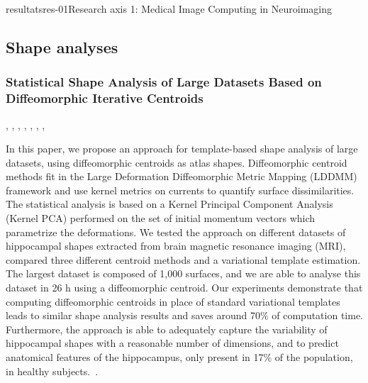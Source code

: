 \documentclass{ra2018}
\begin{document}
\begin{module}{resultats}{res-01}{Research axis 1: Medical Image Computing in Neuroimaging}
\subsection{Shape analyses}
\subsubsection{Statistical Shape Analysis of Large Datasets Based on Diffeomorphic Iterative Centroids}
\begin{participants}
      , 
      ,
      ,
      ,
      ,
      ,
      ,
\end{participants}
In this paper, we propose an approach for template-based shape analysis of large datasets, using diffeomorphic centroids as atlas shapes. Diffeomorphic centroid methods fit in the Large Deformation Diffeomorphic Metric Mapping (LDDMM) framework and use kernel metrics on currents to quantify surface dissimilarities. The statistical analysis is based on a Kernel Principal Component Analysis (Kernel PCA) performed on the set of initial momentum vectors which parametrize the deformations. We tested the approach on different datasets of hippocampal shapes extracted from brain magnetic resonance imaging (MRI), compared three different centroid methods and a variational template estimation. The largest dataset is composed of 1,000 surfaces, and we are able to analyse this dataset in 26 h using a diffeomorphic centroid. Our experiments demonstrate that computing diffeomorphic centroids in place of standard variational templates leads to similar shape analysis results and saves around 70\% of computation time. Furthermore, the approach is able to adequately capture the variability of hippocampal shapes with a reasonable number of dimensions, and to predict anatomical features of the hippocampus, only present in 17\% of the population, in healthy subjects.~\cite{cury:hal-01920263}.

\end{module}
\end{document}

